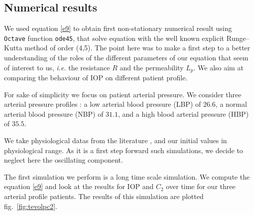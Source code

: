 \subsection{Numerical results}
We used equation \eqref{e9} to obtain first non-stationary numerical result using \texttt{Octave} function \texttt{ode45}, that solve equation with the well known explicit Runge–Kutta method of order (4,5).  The point here was to make a first step to a better understanding of the roles of the different parameters of our equation that seem of interest to us, \textit{i.e.} the resistance $R$ and the permeability $L_p$. We also aim at comparing the behaviour of IOP on different patient profile. 

For sake of simplicity we focus on patient arterial pressure. We consider three arterial pressure profiles : a low arterial blood pressure  (LBP) of $26.6$, a normal arterial blood pressure (NBP) of $31.1$, and a high blood arterial pressure (HBP) of $35.5$.

We take physiological datas from the literature \cite{lyubimov2007,anders1975,To2002 }, and our initial values in physiological range. As it is a first step forward such simulations, we decide to neglect here the oscillating component. 

The first simulation we perform is a long time scale simulation. We compute the equation \eqref{e9} and look at the results for IOP and $C_2$ over time for our three arterial profile patients. The results of this simulation are plotted fig.~\ref{fig:tevolpc2}.

